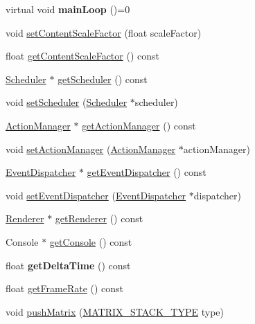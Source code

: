 \begin{DoxyCompactItemize}
\item 
\mbox{\label{classDirector_a3c5e194226ccfe0da560e8ffee8fb95b}} 
virtual void {\bfseries main\+Loop} ()=0
\item 
void \hyperlink{classDirector_a0eef2543f7619fc1539a22b6cfe42acb}{set\+Content\+Scale\+Factor} (float scale\+Factor)
\item 
float \hyperlink{classDirector_a233085ea94b316a44313e4120029f2a4}{get\+Content\+Scale\+Factor} () const
\item 
\hyperlink{classScheduler}{Scheduler} $\ast$ \hyperlink{classDirector_a9deefa201b7826b4c9960c85a4fa7022}{get\+Scheduler} () const
\item 
void \hyperlink{classDirector_a8e802ef200191e7b6e92b08b37c81e4d}{set\+Scheduler} (\hyperlink{classScheduler}{Scheduler} $\ast$scheduler)
\item 
\hyperlink{classActionManager}{Action\+Manager} $\ast$ \hyperlink{classDirector_aecb253e4de577ebd009367f27d2a07de}{get\+Action\+Manager} () const
\item 
void \hyperlink{classDirector_acf717de7917cf4ffd0a3e1c2b1965628}{set\+Action\+Manager} (\hyperlink{classActionManager}{Action\+Manager} $\ast$action\+Manager)
\item 
\hyperlink{classEventDispatcher}{Event\+Dispatcher} $\ast$ \hyperlink{classDirector_ae5984b5ba756d210fa4ec79578d17ca8}{get\+Event\+Dispatcher} () const
\item 
void \hyperlink{classDirector_aaba36d4ea12402524b17755dc3b26b91}{set\+Event\+Dispatcher} (\hyperlink{classEventDispatcher}{Event\+Dispatcher} $\ast$dispatcher)
\item 
\hyperlink{classRenderer}{Renderer} $\ast$ \hyperlink{classDirector_a45e283c703cf856467ccbe484da739c5}{get\+Renderer} () const
\item 
Console $\ast$ \hyperlink{classDirector_a84f3750550158cbd24de5d7783852a12}{get\+Console} () const
\item 
\mbox{\label{classDirector_a81022b89d60dbe3912084200953dbbbe}} 
float {\bfseries get\+Delta\+Time} () const
\item 
float \hyperlink{classDirector_adb86cf6aa40949fd1d43ef8f837062e8}{get\+Frame\+Rate} () const
\item 
void \hyperlink{classDirector_afbc7bc9b5641105eae937965146ea3e2}{push\+Matrix} (\hyperlink{group__base_ga4d146cef7130a8f3a953d46964ea3905}{M\+A\+T\+R\+I\+X\+\_\+\+S\+T\+A\+C\+K\+\_\+\+T\+Y\+PE} type)

\end{DoxyCompactItemize}
